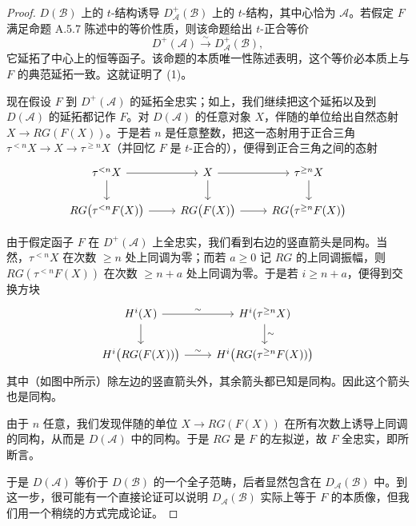 \begin{proof}
$D(\mathcal B)$ 上的 $t$-结构诱导 $D^+_{\mathcal A}(\mathcal B)$ 上的 $t$-结构，其中心恰为 $\mathcal A$。若假定 $F$ 满足命题 A.5.7 陈述中的等价性质，则该命题给出 $t$-正合等价
\[
D^+(\mathcal A)\xrightarrow{\sim}D^+_{\mathcal A}(\mathcal B),
\]
它延拓了中心上的恒等函子。该命题的本质唯一性陈述表明，这个等价必本质上与 $F$ 的典范延拓一致。这就证明了 \textup{(1)}。


现在假设 $F$ 到 $D^+(\mathcal A)$ 的延拓全忠实；如上，我们继续把这个延拓以及到 $D(\mathcal A)$ 的延拓都记作 $F$。对 $D(\mathcal A)$ 的任意对象 $X$，伴随的单位给出自然态射 $X\to RG(F(X))$。于是若 $n$ 是任意整数，把这一态射用于正合三角 $\tau^{<n}X\to X\to\tau^{\geq n}X$（并回忆 $F$ 是 $t$-正合的），便得到正合三角之间的态射
\begin{equation*}
\begin{tikzcd}
\tau^{<n}X \arrow[r] \arrow[d] & X \arrow[r] \arrow[d] & \tau^{\geq n}X \arrow[d] \\
RG\bigl(\tau^{<n}F(X)\bigr) \arrow[r] & RG\bigl(F(X)\bigr) \arrow[r] & RG\bigl(\tau^{\geq n}F(X)\bigr)
\end{tikzcd}
\end{equation*}

由于假定函子 $F$ 在 $D^+(\mathcal A)$ 上全忠实，我们看到右边的竖直箭头是同构。当然，$\tau^{<n}X$ 在次数 $\geq n$ 处上同调为零；而若 $a\geq0$ 记 $RG$ 的上同调振幅，则 $RG(\tau^{<n}F(X))$ 在次数 $\geq n+a$ 处上同调为零。于是若 $i\geq n+a$，便得到交换方块
\begin{equation*}
\begin{tikzcd}
H^i(X) \arrow[r, "\sim"] \arrow[d] & H^i(\tau^{\geq n}X) \arrow[d, "\sim"] \\
H^i\bigl(RG(F(X))\bigr) \arrow[r, "\sim"] & H^i\bigl(RG(\tau^{\geq n}F(X))\bigr)
\end{tikzcd}
\end{equation*}
其中（如图中所示）除左边的竖直箭头外，其余箭头都已知是同构。因此这个箭头也是同构。

由于 $n$ 任意，我们发现伴随的单位 $X\to RG(F(X))$ 在所有次数上诱导上同调的同构，从而是 $D(\mathcal A)$ 中的同构。于是 $RG$ 是 $F$ 的左拟逆，故 $F$ 全忠实，即所断言。

于是 $D(\mathcal A)$ 等价于 $D(\mathcal B)$ 的一个全子范畴，后者显然包含在 $D_{\mathcal A}(\mathcal B)$ 中。到这一步，很可能有一个直接论证可以说明 $D_{\mathcal A}(\mathcal B)$ 实际上等于 $F$ 的本质像，但我们用一个稍绕的方式完成论证。


\end{proof}
